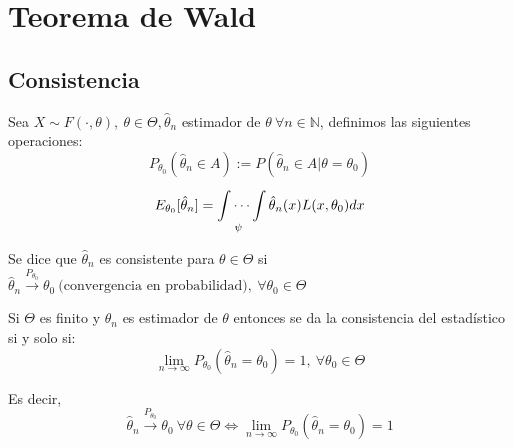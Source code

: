 \documentclass[openany]{book}
\begin{document}






\section{Teorema de Wald}

 \subsection*{Consistencia}
 Sea $ X \sim F(\cdot ,\theta),\ \theta \in \Theta, \hat{\theta}_n $ estimador de $ \theta\ \forall n \in \mathbb{N} $, definimos las siguientes operaciones:
 $$ P_{\theta_0}(\hat{\theta}_n \in A ) := P(\hat{\theta}_n\in A| \theta = \theta_0) $$
$$ E_{\theta_0}[\hat{\theta}_n] = \idotsint\limits_{\psi}^{}\hat{\theta}_n(x)L(x,\theta_0)dx $$

Se dice que $ \hat{\theta}_n $ es consistente para $ \theta \in \Theta $ si $ \hat{\theta}_n\xrightarrow{P_{\theta_0}} \theta_0\ \text{(convergencia en probabilidad)},\ \forall \theta_0 \in \Theta $


\begin{proposition}
    Si $ \Theta $ es finito y $ \hat{\theta}_n $ es estimador de $ \theta $ entonces se da la consistencia del estadístico si y solo si:
    $$ \lim_{n \to \infty}P_{\theta_0}(\hat{\theta}_n=\theta_0)=1,\ \forall \theta_0 \in \Theta $$
    
    Es decir,
    $$ \hat{\theta}_{n} \xrightarrow{P_{\theta_0}} \theta_0\ \forall \theta \in \Theta \iff \lim_{n \to \infty}P_{\theta_0}(\hat{\theta}_{n}=\theta_0 )=1$$
    
\end{proposition}
\end{document}
